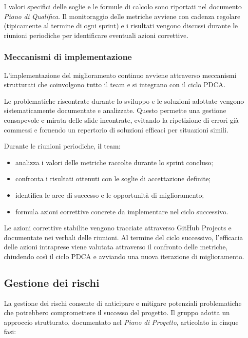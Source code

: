 \documentclass[a4paper, 11pt, oneside]{scrartcl} %
\begin{document}
\noindent
I valori specifici delle soglie e le formule di calcolo sono riportati nel documento \emph{Piano di Qualifica}.
Il monitoraggio delle metriche avviene con cadenza regolare (tipicamente al termine di ogni sprint) e i risultati vengono discussi durante le riunioni periodiche per identificare eventuali azioni correttive.

\subsubsection{Meccanismi di implementazione}
L'implementazione del miglioramento continuo avviene attraverso meccanismi strutturati che coinvolgono tutto il team e si integrano con il ciclo PDCA.

Le problematiche riscontrate durante lo sviluppo e le soluzioni adottate vengono sistematicamente documentate e analizzate.
Questo permette una gestione consapevole e mirata delle sfide incontrate, evitando la ripetizione di errori già commessi e fornendo un repertorio di soluzioni efficaci per situazioni simili.

Durante le riunioni periodiche, il team:
\begin{itemize}
    \item analizza i valori delle metriche raccolte durante lo sprint concluso;
    \item confronta i risultati ottenuti con le soglie di accettazione definite;
    \item identifica le aree di successo e le opportunità di miglioramento;
    \item formula azioni correttive concrete da implementare nel ciclo successivo.
\end{itemize}

Le azioni correttive stabilite vengono tracciate attraverso GitHub Projects{\scriptsize{}} e documentate nei verbali delle riunioni.
Al termine del ciclo successivo, l'efficacia delle azioni intraprese viene valutata attraverso il confronto delle metriche, chiudendo così il ciclo PDCA e avviando una nuova iterazione di miglioramento.

\subsection{Gestione dei rischi}
La gestione dei rischi consente di anticipare e mitigare potenziali problematiche che potrebbero compromettere il successo del progetto.
Il gruppo adotta un approccio strutturato, documentato nel \emph{Piano di Progetto}{\scriptsize{}}, articolato in cinque fasi:
\end{document}

